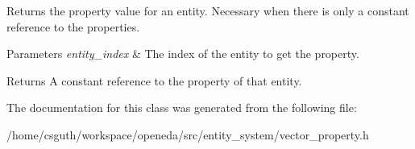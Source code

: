 Returns the property value for an entity. Necessary when there is only a constant reference to the properties. 
\begin{DoxyParams}{Parameters}
{\em entity\-\_\-index} & The index of the entity to get the property. \\
\hline
\end{DoxyParams}
\begin{DoxyReturn}{Returns}
A constant reference to the property of that entity. 
\end{DoxyReturn}


The documentation for this class was generated from the following file\-:\begin{DoxyCompactItemize}
\item 
/home/csguth/workspace/openeda/src/entity\-\_\-system/vector\-\_\-property.\-h\end{DoxyCompactItemize}
